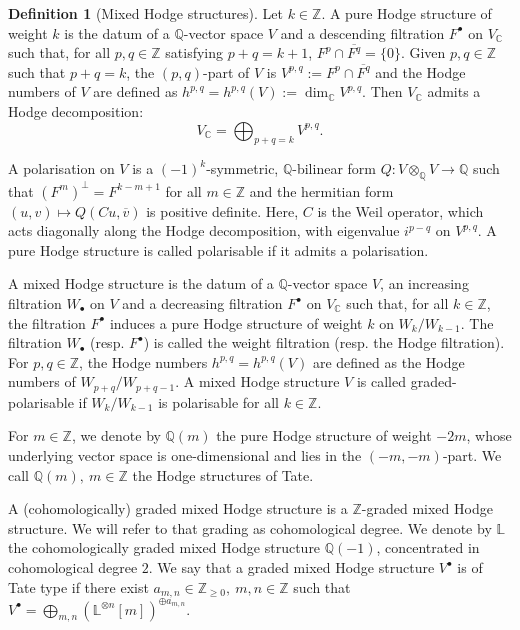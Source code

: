 \documentclass[11pt,english]{article}
\numberwithin{equation}{section}
\numberwithin{figure}{section}
\theoremstyle{definition}
\newtheorem{df}{Definition}[subsection]
\theoremstyle{plain}
\theoremstyle{remark}
\newcommand\ZZ{\mathbb{Z}}
\newcommand\QQ{\mathbb{Q}}
\newcommand\CC{\mathbb{C}}
\begin{document}
\begin{df}[Mixed Hodge structures]

Let $k\in\ZZ$. A pure Hodge structure of weight $k$ is the datum
of a $\QQ$-vector space $V$ and a descending filtration $F^{\bullet}$
on $V_{\CC}$ such that, for all $p,q\in\ZZ$ satisfying $p+q=k+1$,
$F^{p}\cap\overline{F^{q}}=\{0\}$. Given $p,q\in\ZZ$ such that $p+q=k$,
the $(p,q)$-part of $V$ is $V^{p,q}:=F^{p}\cap\overline{F^{q}}$
and the Hodge numbers of $V$ are defined as $h^{p,q}=h^{p,q}(V):=\dim_{\CC}V^{p,q}$.
Then $V_{\CC}$ admits a Hodge decomposition:\[
V_{\CC}=\bigoplus_{p+q=k}V^{p,q}.
\]

A polarisation on $V$ is a $(-1)^{k}$-symmetric, $\QQ$-bilinear
form $Q:V\otimes_{\QQ}V\rightarrow\QQ$ such that $(F^{m})^{\perp}=F^{k-m+1}$
for all $m\in\ZZ$ and the hermitian form $(u,v)\mapsto Q(Cu,\overline{v})$
is positive definite. Here, $C$ is the Weil operator, which acts
diagonally along the Hodge decomposition, with eigenvalue $i^{p-q}$
on $V^{p,q}$. A pure Hodge structure is called polarisable if it
admits a polarisation.

A mixed Hodge structure is the datum of a $\QQ$-vector space $V$,
an increasing filtration $W_{\bullet}$ on $V$ and a decreasing filtration
$F^{\bullet}$ on $V_{\CC}$ such that, for all $k\in\ZZ$, the filtration
$F^{\bullet}$ induces a pure Hodge structure of weight $k$ on $W_{k}/W_{k-1}$.
The filtration $W_{\bullet}$ (resp. $F^{\bullet}$) is called the
weight filtration (resp. the Hodge filtration). For $p,q\in\ZZ$,
the Hodge numbers $h^{p,q}=h^{p,q}(V)$ are defined as the Hodge numbers
of $W_{p+q}/W_{p+q-1}$. A mixed Hodge structure $V$ is called graded-polarisable
if $W_{k}/W_{k-1}$ is polarisable for all $k\in\ZZ$.

For $m\in\ZZ$, we denote by $\QQ(m)$ the pure Hodge structure of
weight $-2m$, whose underlying vector space is one-dimensional and
lies in the $(-m,-m)$-part. We call $\QQ(m),\ m\in\ZZ$ the Hodge
structures of Tate.

A (cohomologically) graded mixed Hodge structure is a $\ZZ$-graded
mixed Hodge structure. We will refer to that grading as cohomological
degree. We denote by $\mathbb{L}$ the cohomologically graded mixed
Hodge structure $\QQ(-1)$, concentrated in cohomological degree $2$.
We say that a graded mixed Hodge structure $V^{\bullet}$ is of Tate
type if there exist $a_{m,n}\in\ZZ_{\geq0},\ m,n\in\ZZ$ such that
$V^{\bullet}=\bigoplus_{m,n}\left(\mathbb{L}^{\otimes n}[m]\right)^{\oplus a_{m,n}}$.

\end{df}
\end{document}

